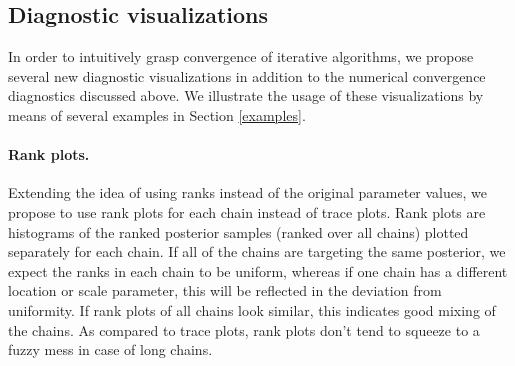 \documentclass[american,]{article}
\providecommand{\tightlist}{%
  \setlength{\itemsep}{0pt}\setlength{\parskip}{0pt}}
\let\oldparagraph\paragraph
\renewcommand{\paragraph}[1]{\oldparagraph{#1}\mbox{}}
\begin{document}




\hypertarget{diagnostic-visualizations}{%
\subsection{Diagnostic visualizations}\label{diagnostic-visualizations}}

In order to intuitively grasp convergence of iterative algorithms, we
propose several new diagnostic visualizations in addition to the numerical
convergence diagnostics discussed above. We illustrate the usage of
these visualizations by means of several examples in Section
\ref{examples}.

\hypertarget{rank-plots}{%
\paragraph{Rank plots.}\label{rank-plots}}
Extending the idea of using ranks instead of the original parameter
values, we propose to use rank plots for each chain instead
of trace plots. Rank plots are histograms of the
ranked posterior samples (ranked over all chains) plotted separately for
each chain. If all of the chains are targeting the same posterior, we expect the 
ranks in each chain to be uniform, whereas if one chain has a different location
or scale parameter, this will be reflected in the deviation from uniformity. 
 If rank plots of all chains look similar, this indicates
good mixing of the chains. As compared to trace plots, rank plots don't
tend to squeeze to a fuzzy mess in case of long chains.
\end{document}
